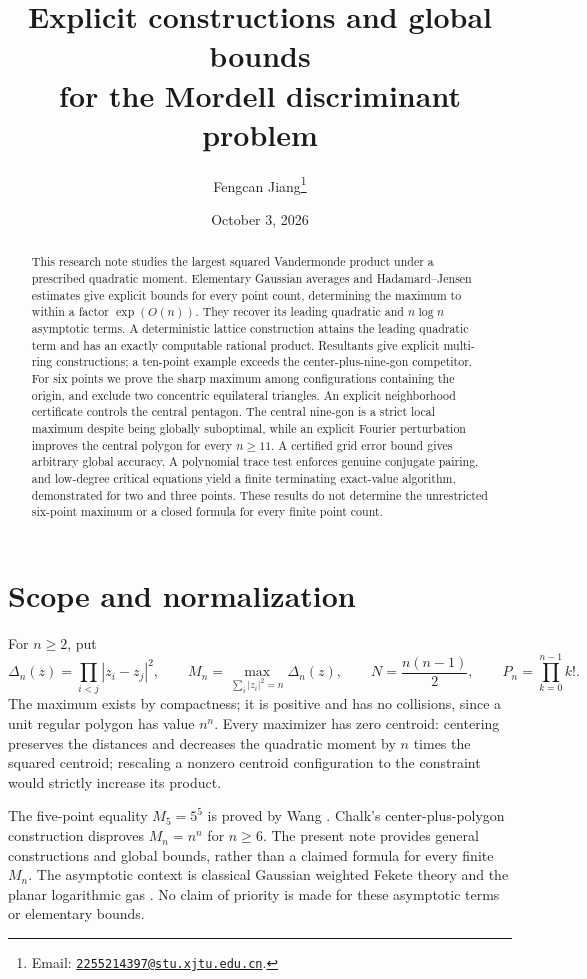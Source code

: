 \documentclass[11pt]{article}
\title{Explicit constructions and global bounds\\for the Mordell discriminant problem}
\author{Fengcan Jiang\thanks{Email:
\href{mailto:2255214397@stu.xjtu.edu.cn}{\texttt{2255214397@stu.xjtu.edu.cn}}.}}
\date{October 3, 2026}
\theoremstyle{remark}
\numberwithin{equation}{section}
\begin{document}
\maketitle
\begin{abstract}
This research note studies the largest squared Vandermonde product
under a prescribed quadratic moment. Elementary Gaussian averages
and Hadamard--Jensen estimates give explicit bounds for every point
count, determining the maximum to within a factor $\exp(O(n))$.
They recover its leading quadratic and $n\log n$ asymptotic terms.
A deterministic lattice construction attains the leading quadratic
term and has an exactly computable rational product. Resultants give
explicit multi-ring constructions; a ten-point example exceeds the
center-plus-nine-gon competitor. For six points we prove the sharp
maximum among configurations containing the origin, and exclude two
concentric equilateral triangles. An explicit neighborhood certificate
controls the central pentagon. The central nine-gon is a strict local
maximum despite being globally suboptimal, while an explicit Fourier
perturbation improves the central polygon for every $n\ge11$.
A certified grid error bound gives arbitrary global accuracy.
A polynomial trace test enforces genuine conjugate pairing, and
low-degree critical equations yield a finite terminating exact-value
algorithm, demonstrated for two and three points. These results do
not determine the unrestricted six-point maximum or a closed formula
for every finite point count.
\end{abstract}

\section{Scope and normalization}
For $n\ge2$, put
\[
 \Delta_n(z)=\prod_{i<j}|z_i-z_j|^2,\qquad
 M_n=\max_{\sum_i|z_i|^2=n}\Delta_n(z),\qquad
 N=\frac{n(n-1)}2,\qquad P_n=\prod_{k=0}^{n-1}k!.
\]
The maximum exists by compactness; it is positive and has no
collisions, since a unit regular polygon has value $n^n$.
Every maximizer has zero centroid: centering preserves the distances
and decreases the quadratic moment by $n$ times the squared centroid;
rescaling a nonzero centroid configuration to the constraint would
strictly increase its product.

The five-point equality $M_5=5^5$ is proved by Wang \cite{Wang}.
Chalk's center-plus-polygon construction \cite{Chalk} disproves
$M_n=n^n$ for $n\ge6$. The present note provides general constructions
and global bounds, rather than a claimed formula for every finite $M_n$.
The asymptotic context is classical Gaussian weighted Fekete theory
and the planar logarithmic gas \cite{AOC,SS}. No claim of priority is
made for these asymptotic terms or elementary bounds.
\end{document}

